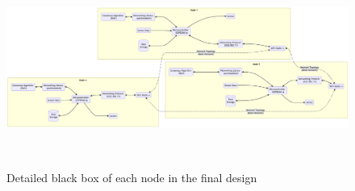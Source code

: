 \begin{figure}[H]
    \centering
    \includegraphics[width=1\textwidth]{final-proposal/images/final_design_nodes.png}
    \caption{Detailed black box of each node in the final design}
    \label{fig:final_design_node_bb}
    


     

      
\end{figure}



